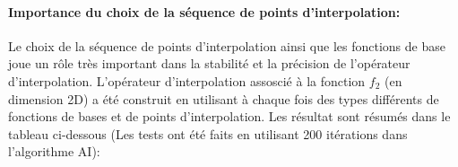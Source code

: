 \paragraph{Importance du choix de la séquence de points d'interpolation:\\}
\hspace{0.5cm} Le choix de la séquence de points d'interpolation ainsi que les fonctions de base joue un rôle très important dans la stabilité et la précision de l'opérateur d'interpolation.
L'opérateur d'interpolation assoscié à la fonction $f_2$ (en dimension 2D) a été construit en utilisant à chaque fois des types différents de fonctions de bases et de points d'interpolation.
Les résultat sont résumés dans le tableau ci-dessous (Les tests ont été faits en utilisant 200 itérations dans l'algorithme AI):

